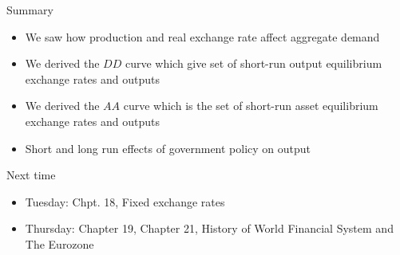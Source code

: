 \documentclass{beamer}
\begin{document}
\begin{frame}{Summary}

    \begin{itemize}
        \item We saw how production and real exchange rate affect aggregate demand
        \item We derived the $DD$ curve which give set of short-run output equilibrium exchange rates and outputs
        \item We derived the $AA$ curve which is the set of short-run asset equilibrium exchange rates and outputs
        \item Short and long run effects of government policy on output
    \end{itemize}
\end{frame}

\begin{frame}{Next time}
    \begin{itemize}
        \item Tuesday: Chpt. 18, Fixed exchange rates
        \item Thursday: Chapter 19, Chapter 21, History of World Financial System and The Eurozone
    \end{itemize}
\end{frame}

% 
% 
\end{document}
